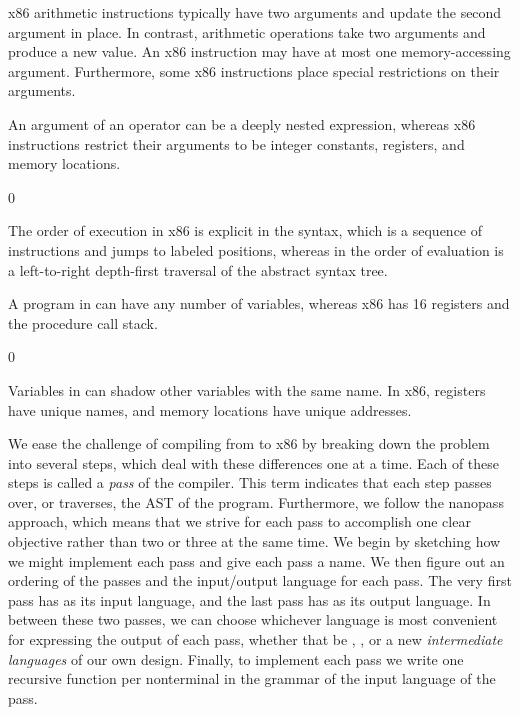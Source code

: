 \documentclass[7x10]{TimesAPriori_MIT}%
\def\racketEd{0}
\def\edition{0}
\numberwithin{theorem}{chapter}
\numberwithin{definition}{chapter}
\numberwithin{equation}{chapter}
\begin{document}
\begin{enumerate}
\item x86 arithmetic instructions typically have two arguments and
  update the second argument in place. In contrast, \LangVar{}
  arithmetic operations take two arguments and produce a new value.
  An x86 instruction may have at most one memory-accessing argument.
  Furthermore, some x86 instructions place special restrictions on
  their arguments.

\item An argument of an \LangVar{} operator can be a deeply nested
  expression, whereas x86 instructions restrict their arguments to be
  integer constants, registers, and memory locations.

{\if\edition\racketEd      
\item The order of execution in x86 is explicit in the syntax, which
  is a sequence of instructions and jumps to labeled positions,
  whereas in \LangVar{} the order of evaluation is a left-to-right
  depth-first traversal of the abstract syntax tree.  \fi}

\item A program in \LangVar{} can have any number of variables,
  whereas x86 has 16 registers and the procedure call stack.
{\if\edition\racketEd    
\item Variables in \LangVar{} can shadow other variables with the
  same name. In x86, registers have unique names, and memory locations
  have unique addresses.
\fi}  
\end{enumerate}

We ease the challenge of compiling from \LangVar{} to x86 by breaking
down the problem into several steps, which deal with these differences
one at a time. Each of these steps is called a \emph{pass} of the
compiler.
%
This term indicates that each step passes over, or traverses, the AST
of the program.
%
Furthermore, we follow the nanopass approach, which means that we
strive for each pass to accomplish one clear objective rather than two
or three at the same time.
%
We begin by sketching how we might implement each pass and give each
pass a name.  We then figure out an ordering of the passes and the
input/output language for each pass. The very first pass has
\LangVar{} as its input language, and the last pass has \LangXInt{} as
its output language. In between these two passes, we can choose
whichever language is most convenient for expressing the output of
each pass, whether that be \LangVar{}, \LangXInt{}, or a new
\emph{intermediate languages} of our own design.  Finally, to
implement each pass we write one recursive function per nonterminal in
the grammar of the input language of the pass.
\end{document}
